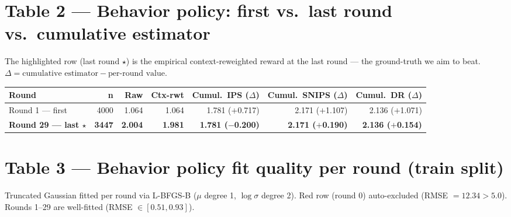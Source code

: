 \documentclass[11pt]{article}
\begin{document}
\section*{Table 2 — Behavior policy: first vs.\ last round vs.\ cumulative estimator}

{\small The highlighted row (last round $\star$) is the empirical context-reweighted reward at the
last round --- the ground-truth we aim to beat.
$\Delta = \text{cumulative estimator} - \text{per-round value}$.}

\bigskip
\begin{tabular}{lrrrrrr}
\toprule
\textbf{Round} & \textbf{n} & \textbf{Raw} & \textbf{Ctx-rwt} & \textbf{Cumul.\ IPS ($\Delta$)} & \textbf{Cumul.\ SNIPS ($\Delta$)} & \textbf{Cumul.\ DR ($\Delta$)} \\
\midrule
Round 1 --- first & 4000 & 1.064 & 1.064 & 1.781 ($+$0.717) & 2.171 ($+$1.107) & 2.136 ($+$1.071) \\
\rowcolor{groundbg}
\textbf{Round 29 --- last $\star$} & \textbf{3447} & \textbf{2.004} & \textbf{1.981} & \textbf{1.781 ($-$0.200)} & \textbf{2.171 ($+$0.190)} & \textbf{2.136 ($+$0.154)} \\
\bottomrule
\end{tabular}

\section*{Table 3 — Behavior policy fit quality per round (train split)}

{\small Truncated Gaussian fitted per round via L-BFGS-B ($\mu$ degree 1, $\log\sigma$ degree 2).
\colorbox{red!20}{Red row} (round 0) auto-excluded (RMSE $= 12.34 > 5.0$).
Rounds 1--29 are well-fitted (RMSE $\in [0.51, 0.93]$).}
\end{document}
